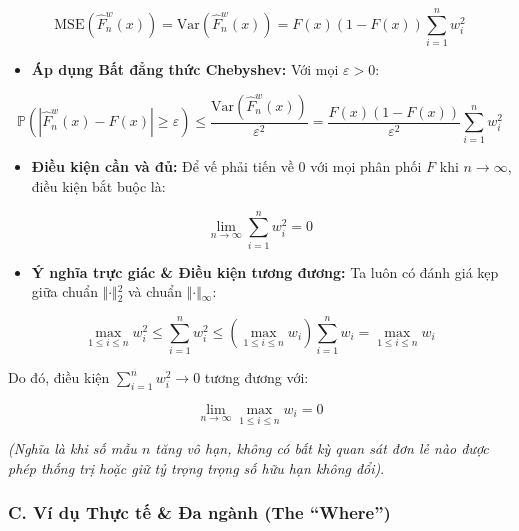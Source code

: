 \documentclass[12pt,a4paper]{article}
\begin{document}
\[\text{MSE}\left(\widehat{F}_n^w(x)\right) = \text{Var}\left(\widehat{F}_n^w(x)\right) = F(x)(1 - F(x)) \sum_{i=1}^n w_i^2\]

\begin{itemize}

\item
  \textbf{Áp dụng Bất đẳng thức Chebyshev:}
  Với mọi \(\varepsilon > 0\):
\end{itemize}

\[\mathbb{P}\left(\left\vert{}\widehat{F}_n^w(x) - F(x)\right\vert{} \ge \varepsilon\right) \le \frac{\text{Var}\left(\widehat{F}_n^w(x)\right)}{\varepsilon^2} = \frac{F(x)(1 - F(x))}{\varepsilon^2} \sum_{i=1}^n w_i^2\]

\begin{itemize}

\item
  \textbf{Điều kiện cần và đủ:}
  Để vế phải tiến về \(0\) với mọi phân phối \(F\) khi \(n \to \infty\), điều kiện bắt buộc là:
\end{itemize}

\[\lim_{n \to \infty} \sum_{i=1}^n w_i^2 = 0\]

\begin{itemize}

\item
  \textbf{Ý nghĩa trực giác \& Điều kiện tương đương:}
  Ta luôn có đánh giá kẹp giữa chuẩn \(\Vert{}\cdot\Vert{}_2^2\) và chuẩn \(\Vert{}\cdot\Vert{}_\infty\):
\end{itemize}

\[\max_{1 \le i \le n} w_i^2 \le \sum_{i=1}^n w_i^2 \le \left(\max_{1 \le i \le n} w_i\right) \sum_{i=1}^n w_i = \max_{1 \le i \le n} w_i\]

Do đó, điều kiện \(\sum_{i=1}^n w_i^2 \to 0\) tương đương với:

\[\lim_{n \to \infty} \max_{1 \le i \le n} w_i = 0\]

\emph{(Nghĩa là khi số mẫu \(n\) tăng vô hạn, không có bất kỳ quan sát đơn lẻ nào được phép thống trị hoặc giữ tỷ trọng trọng số hữu hạn không đổi)}.

\subsubsection{C. Ví dụ Thực tế \& Đa ngành (The ``Where'')}\label{c.-vuxed-dux1ee5-thux1ef1c-tux1ebf-ux111a-nguxe0nh-the-where-7}
\end{document}
